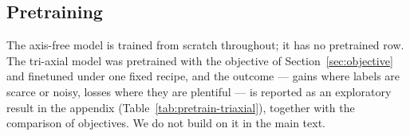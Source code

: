 \begin{table}[t]
\centering
\small
\caption{CroFreMo's tokenizer in place of the host's own, hosts trained
from scratch. Native rows are three-seed means except REVE from scratch
(single seed); transplants are single seeds. Cohen's $\kappa$; CHB-MIT
AUC-PR.}
\label{tab:hosts}
\end{table}

\subsection{Pretraining}
\label{sec:pretrain-results}

The axis-free model is trained from scratch throughout; it has no
pretrained row. The tri-axial model was pretrained with the objective of
Section~\ref{sec:objective} and finetuned under one fixed recipe, and the
outcome --- gains where labels are scarce or noisy, losses where they are
plentiful --- is reported as an exploratory result in the appendix
(Table~\ref{tab:pretrain-triaxial}), together with the comparison of
objectives. We do not build on it in the main text.
